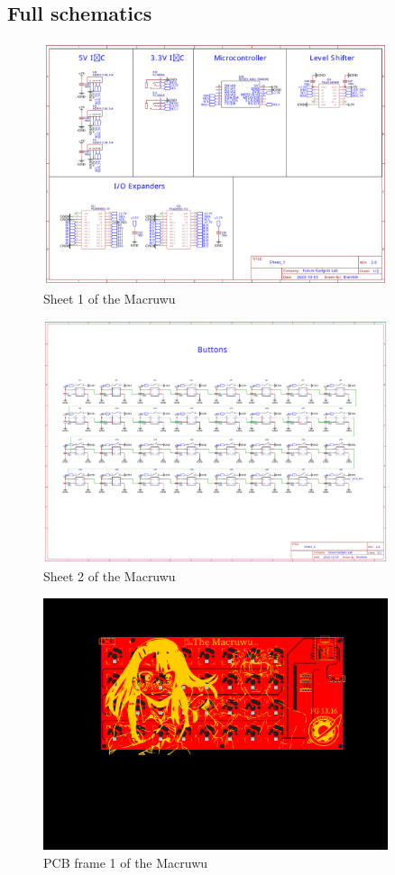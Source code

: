 \documentclass[english, 12pt]{scrartcl}
\begin{document}
	\subsection{Full schematics}
	\begin{figure}[H]
		\centering
		\includegraphics[width=0.9\textwidth]{sheet_1}
		\caption{Sheet 1 of the Macruwu}
	\end{figure}
	\begin{figure}[H]
		\centering
		\includegraphics[width=0.9\textwidth]{sheet_2}
		\caption{Sheet 2 of the Macruwu}
	\end{figure}
	\begin{figure}[H]
		\centering
		\includegraphics[width=0.9\textwidth]{Macruwu PCB_1}
		\caption{PCB frame 1 of the Macruwu}
	\end{figure}
\end{document}
